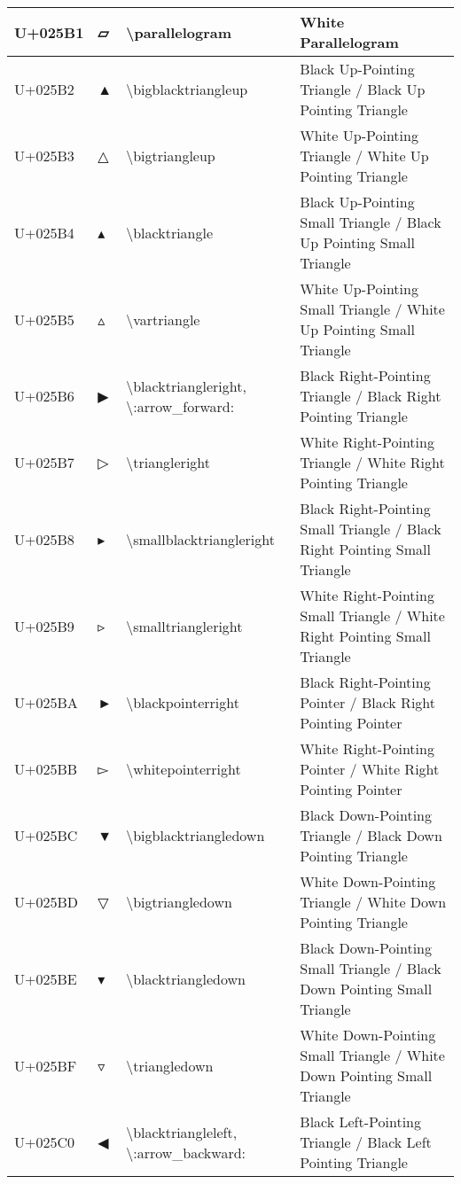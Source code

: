 \begin{table}[h]
\begin{tabulary}{\linewidth}{|L|L|L|L|}
\hline
U+025B1 & ▱ & {\textbackslash}parallelogram & White Parallelogram \\
\hline
U+025B2 & ▲ & {\textbackslash}bigblacktriangleup & Black Up-Pointing Triangle / Black Up Pointing Triangle \\
\hline
U+025B3 & △ & {\textbackslash}bigtriangleup & White Up-Pointing Triangle / White Up Pointing Triangle \\
\hline
U+025B4 & ▴ & {\textbackslash}blacktriangle & Black Up-Pointing Small Triangle / Black Up Pointing Small Triangle \\
\hline
U+025B5 & ▵ & {\textbackslash}vartriangle & White Up-Pointing Small Triangle / White Up Pointing Small Triangle \\
\hline
U+025B6 & ▶ & {\textbackslash}blacktriangleright, {\textbackslash}:arrow\_forward: & Black Right-Pointing Triangle / Black Right Pointing Triangle \\
\hline
U+025B7 & ▷ & {\textbackslash}triangleright & White Right-Pointing Triangle / White Right Pointing Triangle \\
\hline
U+025B8 & ▸ & {\textbackslash}smallblacktriangleright & Black Right-Pointing Small Triangle / Black Right Pointing Small Triangle \\
\hline
U+025B9 & ▹ & {\textbackslash}smalltriangleright & White Right-Pointing Small Triangle / White Right Pointing Small Triangle \\
\hline
U+025BA & ► & {\textbackslash}blackpointerright & Black Right-Pointing Pointer / Black Right Pointing Pointer \\
\hline
U+025BB & ▻ & {\textbackslash}whitepointerright & White Right-Pointing Pointer / White Right Pointing Pointer \\
\hline
U+025BC & ▼ & {\textbackslash}bigblacktriangledown & Black Down-Pointing Triangle / Black Down Pointing Triangle \\
\hline
U+025BD & ▽ & {\textbackslash}bigtriangledown & White Down-Pointing Triangle / White Down Pointing Triangle \\
\hline
U+025BE & ▾ & {\textbackslash}blacktriangledown & Black Down-Pointing Small Triangle / Black Down Pointing Small Triangle \\
\hline
U+025BF & ▿ & {\textbackslash}triangledown & White Down-Pointing Small Triangle / White Down Pointing Small Triangle \\
\hline
U+025C0 & ◀ & {\textbackslash}blacktriangleleft, {\textbackslash}:arrow\_backward: & Black Left-Pointing Triangle / Black Left Pointing Triangle \\

\end{tabulary}
\end{table}
